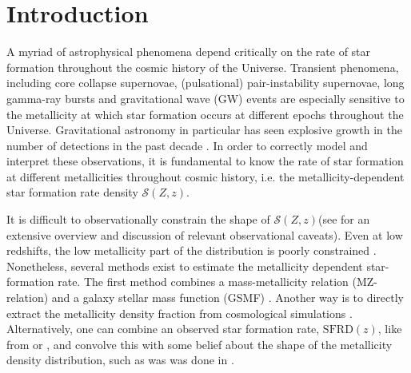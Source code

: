 \documentclass[twocolumn]{aastex631}
\newcommand{\SFRDzZ}{\ensuremath{\mathcal{S}(Z,z)}\xspace}
\newcommand{\SFRDz}{\ensuremath{\mathrm{SFRD}(z)}\xspace}
\begin{document}


\section{Introduction \label{sec: intro}}
A myriad of astrophysical phenomena depend critically on the rate of star formation throughout the cosmic history of the Universe. Transient phenomena, including core collapse supernovae, (pulsational) pair-instability supernovae, long gamma-ray bursts and gravitational wave (GW) events are especially sensitive to the metallicity at which star formation occurs at different epochs throughout the Universe.
Gravitational astronomy in particular has seen explosive growth in the number of detections in the past decade \citep[][]{GWTC1,GWTC2,GWTC3}. In order to correctly model and interpret these observations, it is fundamental to know the rate of star formation at different metallicities throughout cosmic history, i.e. the metallicity-dependent star formation rate density \SFRDzZ \citep[see also the recent review by][]{chruslinska2022_review}.

It is difficult to observationally constrain the shape of \SFRDzZ (see \cite{Chruslinska2019_obs} for an extensive overview and discussion of relevant observational caveats). Even at low redshifts, the low metallicity part of the distribution is poorly constrained \citep{Chruslinska+2021}.
Nonetheless, several methods exist to estimate the metallicity dependent star-formation rate. The first method combines a mass-metallicity relation (MZ-relation) and a galaxy stellar mass function (GSMF) \citep[see e.g.][]{Chruslinska+2018, Chruslinska2019_effectCO, Broekgaarden+2021a}.
Another way is to directly extract the metallicity density fraction from cosmological simulations \citep[e.g.]{Mapelli2017, Briel+2021}.
Alternatively, one can combine an observed star formation rate, \SFRDz, like from \cite{MadauDickinson2014} or \cite{Madau+2017}, and convolve this with some belief about the shape of the metallicity density distribution, such as was was done in \cite{Neijssel+2019}.
\end{document}

